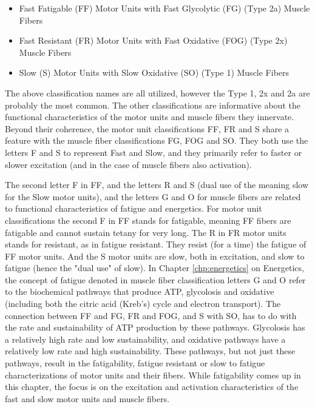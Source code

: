 \begin{itemize}
    \item Fast Fatigable (FF) Motor Units with Fast Glycolytic (FG) (Type 2a) Muscle Fibers
    \item Fast Resistant (FR) Motor Units with Fast Oxidative (FOG) (Type 2x) Muscle Fibers
    \item Slow (S) Motor Units with Slow Oxidative (SO) (Type 1) Muscle Fibers
\end{itemize}

The above classification names are all utilized, however the Type 1, 2x and 2a are probably the most common. The other classifications are informative about the functional characteristics of the motor units and muscle fibers they innervate. Beyond their coherence, the motor unit classifications FF, FR and S share a feature with the muscle fiber classifications FG, FOG and SO. They both use the letters F and S to represent Fast and Slow, and they primarily refer to faster or slower excitation (and in the case of muscle fibers also activation). 

The second letter F in FF, and the letters R and S (dual use of the meaning slow for the Slow motor units), and the letters G and O for muscle fibers are related to functional characteristics of fatigue and energetics. For motor unit classifications the second F in FF stands for fatigable, meaning FF fibers are fatigable and cannot sustain tetany for very long. The R in FR motor units stands for resistant, as in fatigue resistant. They resist (for a time) the fatigue of FF motor units. And the S motor units are slow, both in excitation, and slow to fatigue (hence the "dual use" of slow). In Chapter \ref{chp:energetics} on Energetics, the concept of fatigue denoted in muscle fiber classification letters G and O refer to the biochemical pathways that produce ATP, glycolosis and oxidative (including both the citric acid (Kreb's) cycle and electron transport). The connection between FF and FG, FR and FOG, and S with SO, has to do with the rate and sustainability of ATP production by these pathways. Glycolosis has a relatively high rate and low sustainability, and oxidative pathways have a relatively low rate and high sustainability. These pathways, but not just these pathways, result in the fatigability, fatigue resistant or slow to fatigue characterizations of motor units and their fibers. While fatigability comes up in this chapter, the focus is on the excitation and activation characteristics of the fast and slow motor units and muscle fibers.


